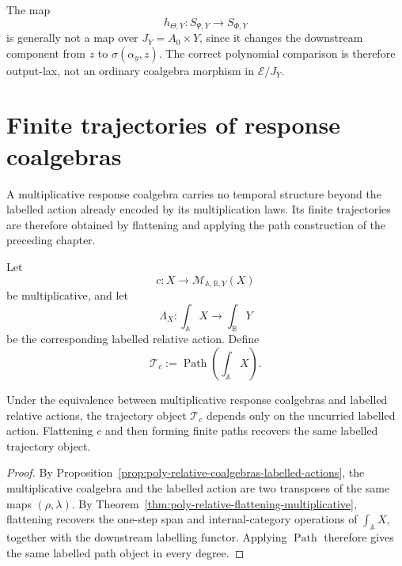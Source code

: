 \begin{remark}
\label{rem:poly-relative-not-ordinary-coalgebra-map}
The map
\[
h_{\Theta,Y}:S_{\Psi,Y}\to S_{\Phi,Y}
\]
is generally not a map over \(J_Y=A_0\times Y\), since it changes the
downstream component from \(z\) to \(\sigma(\alpha_y,z)\).  The correct
polynomial comparison is therefore output-lax, not an ordinary coalgebra
morphism in \(\mathcal E/J_Y\).
\end{remark}


\section{Finite trajectories of response coalgebras}
\label{sec:relative-response-temporalization}

A multiplicative response coalgebra carries no temporal structure beyond the
labelled action already encoded by its multiplication laws.  Its finite
trajectories are therefore obtained by flattening and applying the path
construction of the preceding chapter.

\begin{definition}
\label{def:relative-response-coalgebra-trajectories}
Let
\[
    c:X\to\mathcal M_{\mathbb A,\mathbb B,Y}(X)
\]
be multiplicative, and let
\[
    \Lambda_X:\int_{\mathbb A}X\to\int_{\mathbb B}Y
\]
be the corresponding labelled relative action.  Define
\[
    \mathscr T_c
    :=
    \operatorname{Path}\!\left(\int_{\mathbb A}X\right).
\]
\end{definition}

\begin{proposition}
\label{prop:relative-currying-preserves-trajectories}
Under the equivalence between multiplicative response coalgebras and labelled
relative actions, the trajectory object \(\mathscr T_c\) depends only on the
uncurried labelled action.  Flattening \(c\) and then forming finite paths
recovers the same labelled trajectory object.
\end{proposition}

\begin{proof}
By Proposition~\ref{prop:poly-relative-coalgebras-labelled-actions}, the
multiplicative coalgebra and the labelled action are two transposes of the
same maps \((\rho,\lambda)\).  By
Theorem~\ref{thm:poly-relative-flattening-multiplicative}, flattening recovers
the one-step span and internal-category operations of
\(\int_{\mathbb A}X\), together with the downstream labelling functor.
Applying \(\operatorname{Path}\) therefore gives the same labelled path
object in every degree.
\end{proof}

